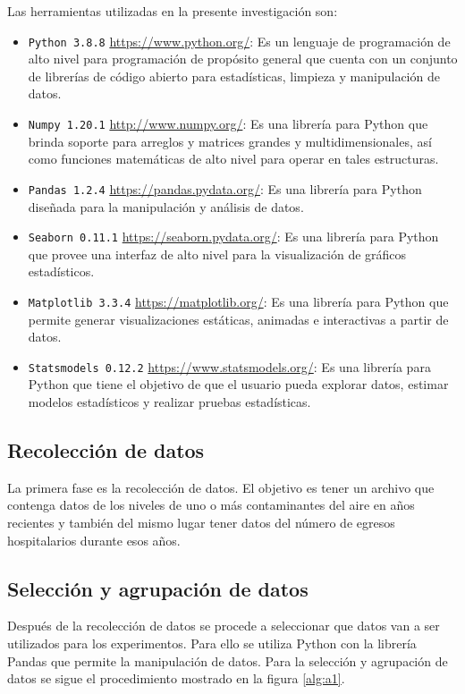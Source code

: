 Las herramientas utilizadas en la presente investigación son:

\begin{itemize}
	\item \texttt{Python 3.8.8} \url{https://www.python.org/}: Es un lenguaje de programación de alto nivel para programación de propósito general que cuenta con un conjunto de librerías de código abierto para estadísticas, limpieza y manipulación de datos.
	\item \texttt{Numpy 1.20.1} \url{http://www.numpy.org/}: Es una librería para Python que brinda soporte para arreglos y matrices grandes y multidimensionales, así como funciones matemáticas de alto nivel para operar en tales estructuras.  
	\item \texttt{Pandas 1.2.4} \url{https://pandas.pydata.org/}: Es una librería para Python diseñada para la manipulación y análisis de datos.
	\item \texttt{Seaborn 0.11.1} \url{https://seaborn.pydata.org/}: Es una librería para Python que provee una interfaz de alto nivel para la visualización de gráficos estadísticos.
	\item \texttt{Matplotlib 3.3.4} \url{https://matplotlib.org/}: Es una librería para Python que permite generar visualizaciones estáticas, animadas e interactivas a partir de datos.
	\item \texttt{Statsmodels 0.12.2} \url{https://www.statsmodels.org/}: Es una librería para Python que tiene el objetivo de que el usuario pueda explorar datos, estimar modelos estadísticos y realizar pruebas estadísticas.
\end{itemize}

\subsection{Recolección de datos}
La primera fase es la recolección de datos. El objetivo es tener un archivo que contenga datos de los niveles de uno o más  contaminantes del aire en años recientes y también del mismo lugar tener datos del número de egresos hospitalarios durante esos años.

\subsection{Selección y agrupación de datos}
Después de la recolección de datos se procede a seleccionar que datos van a ser utilizados para los experimentos. Para ello se utiliza Python con la librería Pandas que permite la manipulación de datos. 
Para la selección y agrupación de datos se sigue el procedimiento mostrado en la figura \ref{alg:a1}.

